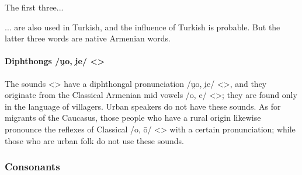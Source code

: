 \begin{table}[H]
	\centering
	\caption{Presence of the vowel /æ/ < > in the Karin dialect}
	\label{tab:Karin:phono:segment:vowel:ae}
\end{table}


The first three... 




\begin{adjarianpage}\label{page:105}\end{adjarianpage}%


... are also used in Turkish, and the influence of Turkish is probable. But the latter three words are native Armenian words.

\paragraph{Diphthongs /u̯o, i̯e/ <>}

The sounds <> have a diphthongal pronunciation /u̯o, i̯e/ <>, and they originate from the Classical Armenian mid vowels /o, e/ <>; they are found only in the language of villagers. Urban speakers do not have these sounds. As for migrants of the Caucasus, those people who have a rural origin likewise pronounce the reflexes of Classical /o, ō/ <> with a certain pronunciation; while those who are urban folk do not use these sounds. 

\subsubsection{Consonants}

